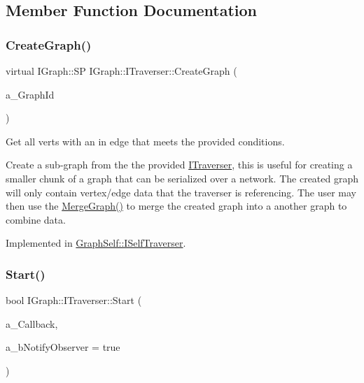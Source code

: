 \subsection{Member Function Documentation}
\mbox{\label{class_i_graph_1_1_i_traverser_ac6ce6b5258a3ef06297b5b91b87bbf00}} 
\subsubsection{\texorpdfstring{Create\+Graph()}{CreateGraph()}}
{\footnotesize\ttfamily virtual I\+Graph\+::\+SP I\+Graph\+::\+I\+Traverser\+::\+Create\+Graph (\begin{DoxyParamCaption}\item[{const std\+::string \&}]{a\+\_\+\+Graph\+Id }\end{DoxyParamCaption})\hspace{0.3cm}{\ttfamily [pure virtual]}}



Get all verts with an in edge that meets the provided conditions. 

Create a sub-\/graph from the the provided \hyperlink{class_i_graph_1_1_i_traverser}{I\+Traverser}, this is useful for creating a smaller chunk of a graph that can be serialized over a network. The created graph will only contain vertex/edge data that the traverser is referencing. The user may then use the \hyperlink{class_i_graph_ac18561fc46a616fde450687f557897ac}{Merge\+Graph()} to merge the created graph into a another graph to combine data. 

Implemented in \hyperlink{class_graph_self_1_1_i_self_traverser_adf9a16dd7596a980483af356e4439724}{Graph\+Self\+::\+I\+Self\+Traverser}.

\mbox{\label{class_i_graph_1_1_i_traverser_ab7995bf2c010898ca3bfb92e4318f8de}} 
\subsubsection{\texorpdfstring{Start()}{Start()}}
{\footnotesize\ttfamily bool I\+Graph\+::\+I\+Traverser\+::\+Start (\begin{DoxyParamCaption}\item[{Traverse\+Callback}]{a\+\_\+\+Callback,  }\item[{bool}]{a\+\_\+b\+Notify\+Observer = {\ttfamily true} }\end{DoxyParamCaption})}

